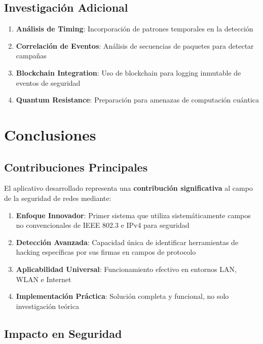 \documentclass[12pt,a4paper]{article}
\begin{document}
\subsection{Investigación Adicional}

\begin{enumerate}
    \item \textbf{Análisis de Timing}: Incorporación de patrones temporales en la detección
    \item \textbf{Correlación de Eventos}: Análisis de secuencias de paquetes para detectar campañas
    \item \textbf{Blockchain Integration}: Uso de blockchain para logging inmutable de eventos de seguridad
    \item \textbf{Quantum Resistance}: Preparación para amenazas de computación cuántica
\end{enumerate}

\section{Conclusiones}

\subsection{Contribuciones Principales}

El aplicativo desarrollado representa una \textbf{contribución significativa} al campo de la seguridad de redes mediante:

\begin{enumerate}
    \item \textbf{Enfoque Innovador}: Primer sistema que utiliza sistemáticamente campos no convencionales de IEEE 802.3 e IPv4 para seguridad
    \item \textbf{Detección Avanzada}: Capacidad única de identificar herramientas de hacking específicas por sus firmas en campos de protocolo
    \item \textbf{Aplicabilidad Universal}: Funcionamiento efectivo en entornos LAN, WLAN e Internet
    \item \textbf{Implementación Práctica}: Solución completa y funcional, no solo investigación teórica
\end{enumerate}

\subsection{Impacto en Seguridad}
\end{document}
